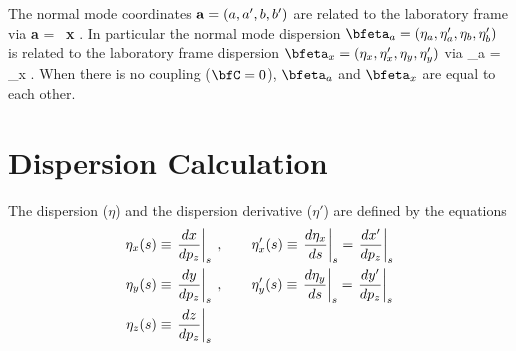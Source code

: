 The normal mode coordinates ${\bf a} = (a, a', b, b')$ are related to
the laboratory frame via
  \Begineq
    {\bf a} = \bfV\inv \, {\bf x}
    . \label{avx}
  \Endeq 
In particular the normal mode dispersion $\bfeta_a = (\eta_a,
\eta'_a, \eta_b, \eta'_b)$ is related to the laboratory frame
dispersion $\bfeta_x = (\eta_x, \eta'_x, \eta_y, \eta'_y)$ via
  \Begineq
    {\bfeta_a} = \bfV\inv \, {\bfeta_x}
    . \label{etaavx}
  \Endeq 
When there is no coupling ($\bfC = 0$), $\bfeta_a$ and $\bfeta_x$ are
equal to each other.

\section{Dispersion Calculation}
\label{s:dispersion}

The dispersion ($\eta$) and the dispersion derivative ($\eta'$) are 
defined by the equations
\begin{align}
  \eta_x(s) &\equiv \left. \frac{dx}{dp_z} \right|_s \> , \qquad
    \eta'_x(s) \equiv \left. \frac{d\eta_x}{ds} \right|_s
    = \left. \frac{dx'}{dp_z} \right|_s \nonumber \\
  \eta_y(s) &\equiv \left. \frac{dy}{dp_z} \right|_s \> , \qquad
    \eta'_y(s) \equiv \left. \frac{d\eta_y}{ds} \right|_s
    = \left. \frac{dy'}{dp_z} \right|_s \\
  \eta_z(s) &\equiv \left. \frac{dz}{dp_z} \right|_s \nonumber
\end{align}

